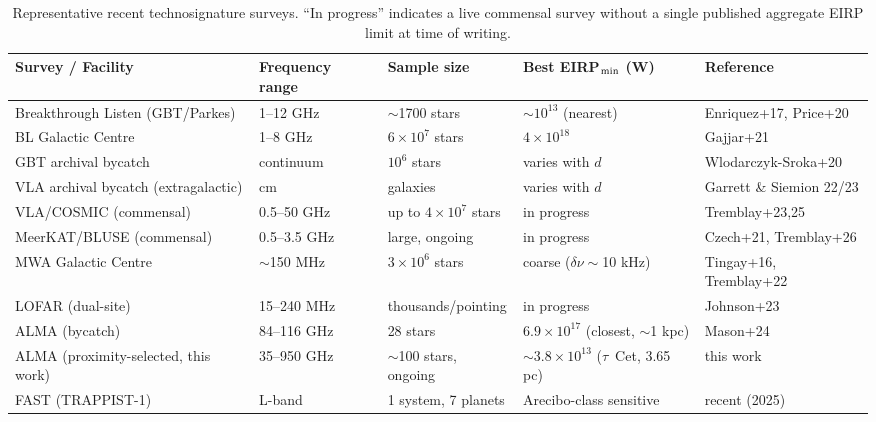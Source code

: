 \documentclass[10pt,twocolumn]{article}
\begin{document}
\begin{table}[t]
\centering
\small
\begin{tabular}{@{}lllll@{}}
\toprule
Survey / Facility & Frequency range & Sample size & Best EIRP$_{\rm min}$ (W) & Reference \\
\midrule
Breakthrough Listen (GBT/Parkes) & 1--12 GHz & $\sim$1700 stars & $\sim10^{13}$ (nearest) & Enriquez+17, Price+20 \\
BL Galactic Centre & 1--8 GHz & $6\times10^7$ stars & $4\times10^{18}$ & Gajjar+21 \\
GBT archival bycatch & continuum & $10^6$ stars & varies with $d$ & Wlodarczyk-Sroka+20 \\
VLA archival bycatch (extragalactic) & cm & galaxies & varies with $d$ & Garrett \& Siemion 22/23 \\
VLA/COSMIC (commensal) & 0.5--50 GHz & up to $4\times10^7$ stars & in progress & Tremblay+23,25 \\
MeerKAT/BLUSE (commensal) & 0.5--3.5 GHz & large, ongoing & in progress & Czech+21, Tremblay+26 \\
MWA Galactic Centre & $\sim$150 MHz & $3\times10^6$ stars & coarse ($\delta\nu\sim$10 kHz) & Tingay+16, Tremblay+22 \\
LOFAR (dual-site) & 15--240 MHz & thousands/pointing & in progress & Johnson+23 \\
ALMA (bycatch) & 84--116 GHz & 28 stars & $6.9\times10^{17}$ (closest, $\sim$1 kpc) & Mason+24 \\
ALMA (proximity-selected, this work) & 35--950 GHz & $\sim$100 stars, ongoing & $\sim3.8\times10^{13}$ ($\tau$~Cet, 3.65 pc) & this work \\
FAST (TRAPPIST-1) & L-band & 1 system, 7 planets & Arecibo-class sensitive & recent (2025) \\
\bottomrule
\end{tabular}
\caption{Representative recent technosignature surveys. ``In progress'' indicates a live commensal survey without a single published aggregate EIRP limit at time of writing.}
\end{table}
\end{document}
